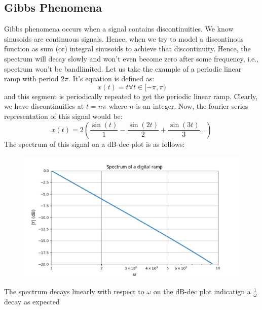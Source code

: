 \documentclass[12pt, a4paper]{article}
\begin{document}
\subsection{Gibbs Phenomena}
Gibbs phenomena occurs when a signal contains discontinuities. We know sinusoids are continuous signals. Hence, when we try to model a discontinous function as sum (or) integral sinusoids to achieve that discontinuity. Hence, the spectrum will decay slowly and won't even become zero after some frequency, i.e., spectrum won't be bandlimited. Let us take the example of a periodic linear ramp with period $2\pi$. It's equation is defined as:
\begin{equation*}
    x(t) = t \forall t \in [-\pi,\pi)
\end{equation*}
and this segment is periodically repeated to get the periodic linear ramp. Clearly, we have discontinuities at $t = n\pi$ where $n$ is an integer. Now, the fourier series representation of this signal would be:
\begin{equation*}
    x(t) = 2(\frac{\sin(t)}{1} - \frac{\sin(2t)}{2} + \frac{\sin(3t)}{3} \ldots )
\end{equation*}
The spectrum of this signal on a dB-dec plot is as follows:
\begin{figure}[H]
    \centering
    \includegraphics[scale = 0.8]{Figure_4.png}
    \label{fig:sample}
\end{figure}
\begin{center}
    The spectrum decays linearly with respect to $\omega$ on the dB-dec plot indicatign a $\frac{1}{\omega}$ decay as expected
\end{center}
\end{document}
